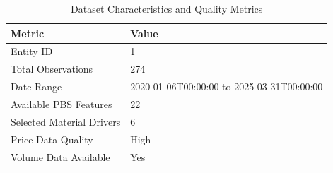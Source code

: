 \begin{table}
\caption{Dataset Characteristics and Quality Metrics}
\label{tab:data_summary}
\begin{tabular}{ll}
\toprule
Metric & Value \\
\midrule
Entity ID & 1 \\
Total Observations & 274 \\
Date Range & 2020-01-06T00:00:00 to 2025-03-31T00:00:00 \\
Available PBS Features & 22 \\
Selected Material Drivers & 6 \\
Price Data Quality & High \\
Volume Data Available & Yes \\
\bottomrule
\end{tabular}
\end{table}
